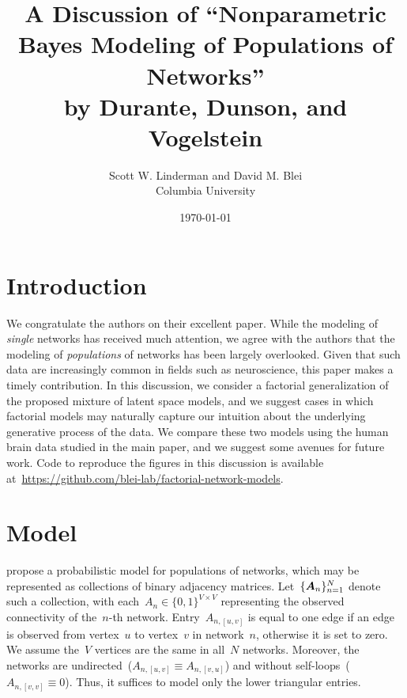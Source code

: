 



\title{A Discussion of ``Nonparametric Bayes Modeling of Populations of Networks''\\
by Durante, Dunson, and Vogelstein}
\author{
  Scott W. Linderman and David M. Blei\\
  Columbia University
}
\date{\today}


\maketitle


\section{Introduction}

We congratulate the authors on their excellent paper.  While the
modeling of \emph{single} networks has received much attention, we agree
with the authors that the modeling of \emph{populations} of
networks has been largely overlooked.  Given that such data are
increasingly common in fields such as neuroscience, this paper makes a
timely contribution.  In this discussion, we consider a factorial
generalization of the proposed mixture of latent space models,
and we suggest cases in which factorial
models may naturally capture our intuition about the
underlying generative process of the data. We compare these two models using the
human brain data studied in the main paper, and we suggest some
avenues for future work.  Code to reproduce the figures in this
discussion is available
at~\url{https://github.com/blei-lab/factorial-network-models}.

\section{Model}
\citet{durante2016nonparametric}
propose a probabilistic model for populations of networks, which may
be represented as collections of binary adjacency matrices.
Let~$\{\boldsymbol{A}_n\}_{n=1}^N$ denote such a collection, with
each~${A_n \in \{0,1\}^{V \times V}}$ representing the observed
connectivity of the~$n$-th network.  Entry~${A_{n,[u,v]}}$ is equal to
one edge if an edge is observed from vertex~$u$ to vertex~$v$ in
network~$n$, otherwise it is set to zero.  We assume the~$V$ vertices
are the same in all~$N$ networks.  Moreover, the networks are
undirected~(${A_{n,[u,v]} \equiv A_{n,[v,u]}}$) and without
self-loops~(${A_{n,[v,v]} \equiv 0}$). Thus, it suffices to model only
the lower triangular entries.

